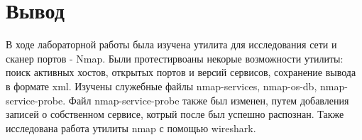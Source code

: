 \documentclass[10pt,a4paper]{report}
\begin{document}
\section{Вывод}
В ходе лабораторной работы была изучена утилита для исследования сети и сканер портов - Nmap. Были протестирвоаны некорые возможности утилиты: поиск активных хостов, открытых портов и версий сервисов, сохранение вывода в формате xml. Изучены служебные файлы nmap-services, nmap-os-db, nmap-service-probe. Файл nmap-service-probe также был изменен, путем добавления записей о собственном сервисе, котрый после был успешно распознан. Также исследована работа утилиты nmap с помощью wireshark.
\end{document}
